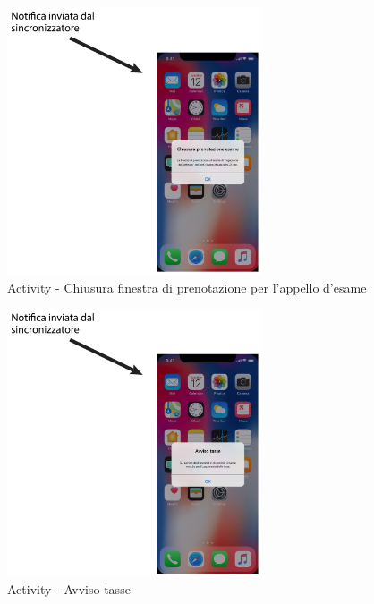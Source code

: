 \begin{figure}
	\centering
	\includegraphics[width=0.67\textwidth]{imgs/gruppo2/activity-notifiche-chiusura-prenotazione-esame}
	\caption{Activity - Chiusura finestra di prenotazione per l'appello d'esame}
	\label{fig:activity-notifiche-chiusura-finestra-esame}
\end{figure}

\begin{figure}
	\centering
	\includegraphics[width=0.67\textwidth]{imgs/gruppo2/activity-notifiche-avviso-tasse}
	\caption{Activity - Avviso tasse}
	\label{fig:activity-notifiche-avviso-tasse}
\end{figure}

